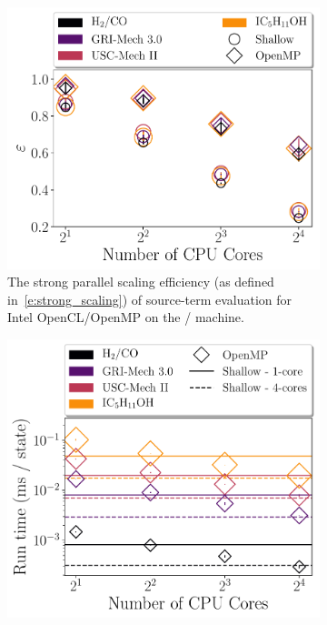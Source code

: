 \documentclass[12pt,number,sort&compress,preprint]{elsarticle}
\begin{document}
\begin{figure}[htbp]
   \centering
  \begin{subfigure}[t]{0.48\linewidth}
      \includegraphics[width=\textwidth]{source_parallel_scaling.pdf}
      \caption{The strong parallel scaling efficiency (as defined in~\cref{e:strong_scaling}) of source-term evaluation for Intel OpenCL\slash OpenMP on the \avx/ machine.}
      \label{F:source_parallel_scaling}
  \end{subfigure}
  \hfill
  \begin{subfigure}[t]{0.48\linewidth}
      \includegraphics[width=\textwidth]{source_crossover.pdf}

\end{subfigure}
\end{figure}
\end{document}
